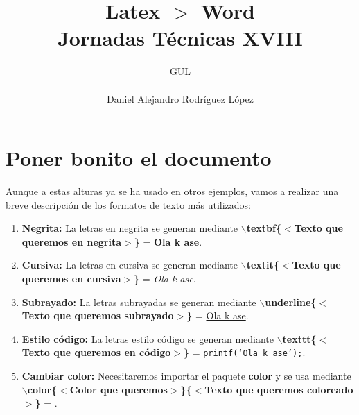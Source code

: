 \documentclass[10pt,a4paper,titlepage]{article} %
\title{ \textbf{ \Huge{Latex $>$ Word}} \\ Jornadas Técnicas XVIII}
\author{
		\begin{tabular}{l}
			\multicolumn{1}{l}{GUL} \\ \hline \\
			Daniel Alejandro Rodríguez López \\
		\end{tabular}
}
\begin{document}
\maketitle

\newpage

\section*{Poner bonito el documento}
	Aunque a estas alturas ya se ha usado en otros ejemplos, vamos a realizar una breve descripción de los formatos de texto más utilizados:
	\begin{enumerate}
		\item \textbf{Negrita:} La letras en negrita se generan mediante \textbf{$\backslash$textbf\{$<$Texto que queremos en negrita$>$\}} = \textbf{Ola k ase}.
		\item \textbf{Cursiva:} La letras en cursiva se generan mediante \textbf{$\backslash$textit\{$<$Texto que queremos en cursiva$>$\}} = \textit{Ola k ase}.
		\item \textbf{Subrayado:} La letras subrayadas se generan mediante \textbf{$\backslash$underline\{$<$Texto que queremos subrayado$>$\}} = \underline{Ola k ase}.
		\item \textbf{Estilo código:} La letras estilo código se generan mediante \textbf{$\backslash$texttt\{$<$Texto que queremos en código$>$\}} = \texttt{printf(`Ola k ase');}.
		\item \textbf{Cambiar color:} Necesitaremos importar el paquete \textbf{color} y se usa mediante \textbf{$\backslash$color\{$<$Color que queremos$>$\}\{$<$Texto que queremos coloreado$>$\}} = \color{blue}{Color azul}.
	\end{enumerate}
\end{document}
